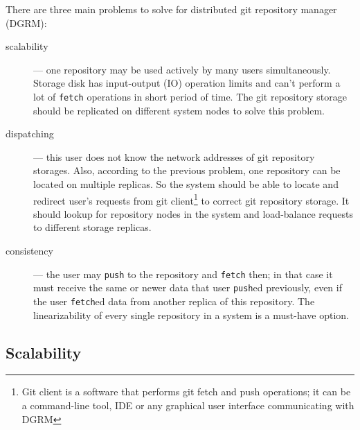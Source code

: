 \documentclass[acmlarge, screen, nonacm, 11pt]{acmart}
\newcommand{\code}[1]{\texttt{#1}}
\begin{document}
There are three main problems to solve for distributed git repository manager (DGRM):
\begin{description}
\item[scalability] --- one repository may be used actively by many users simultaneously. Storage disk
  has input-output (IO) operation limits and can't perform a lot of \code{fetch} operations in
  short period of time. The git repository storage should be replicated on different system nodes to
  solve this problem.
\item[dispatching] --- this user does not know the network addresses of git repository storages. Also, according to the
  previous problem, one repository can be located on multiple replicas.
  So the system should be able to locate and redirect user's requests
  from git client\footnote{Git client is a software that performs git fetch and push operations; it can be
  a command-line tool, IDE or any graphical user interface communicating with DGRM} to correct git repository
  storage. It should lookup for repository nodes in the system and load-balance requests to different storage replicas.
\item[consistency] --- the user may \code{push} to the repository and \code{fetch} then; in that case it must receive
  the same or newer data that user \code{push}ed previously, even if the user \code{fetch}ed data from another
  replica of this repository. The linearizability of every single repository in a system is a must-have option.
\end{description}

\subsection{Scalability}\label{sec:scalability}
\end{document}
